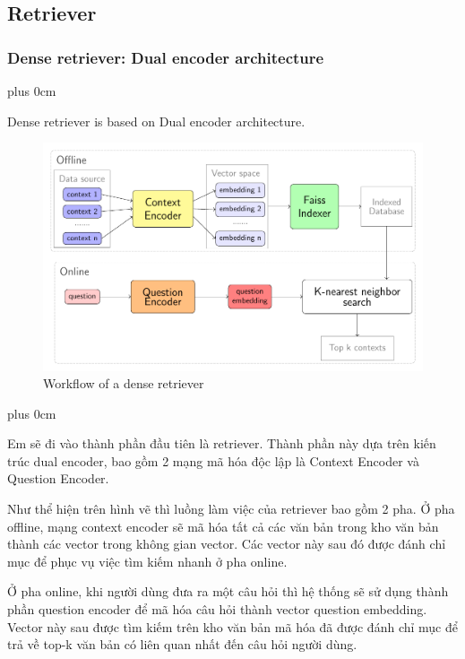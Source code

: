 \documentclass[11pt]{beamer}
\renewcommand{\raggedright}{\leftskip=0pt \rightskip=0pt plus 0cm}
\let\olditemize=\itemize
\renewenvironment{itemize}{\olditemize\raggedright}{\endlist}
\begin{document}
\subsection{Retriever}
\begin{frame}
	\frametitle{Dense retriever: Dual encoder architecture}
	\begin{itemize}
		\item Dense retriever is based on Dual encoder architecture.
	\end{itemize}
	\begin{figure}[h]
		\includegraphics[scale=.57]{images/PDF/biencoder/biencoder.pdf}
		\caption{Workflow of a dense retriever}
	\end{figure}
\end{frame}
\begin{frame}
\begin{itemize}
	\item Em sẽ đi vào thành phần đầu tiên là retriever. Thành phần này dựa trên kiến trúc dual encoder, bao gồm 2 mạng mã hóa độc lập là Context Encoder và Question Encoder.
	\item Như thể hiện trên hình vẽ thì luồng làm việc của retriever bao gồm 2 pha. Ở pha offline, mạng context encoder sẽ mã hóa tất cả các văn bản trong kho văn bản thành các vector trong không gian vector. Các vector này sau đó được đánh chỉ mục để phục vụ việc tìm kiếm nhanh ở pha online.
	\item Ở pha online, khi người dùng đưa ra một câu hỏi thì hệ thống sẽ sử dụng thành phần question encoder để mã hóa câu hỏi thành vector question embedding. Vector này sau được tìm kiếm trên kho văn bản mã hóa đã được đánh chỉ mục để trả về top-k văn bản có liên quan nhất đến câu hỏi người dùng.
\end{itemize}
\end{frame}
\end{document}
